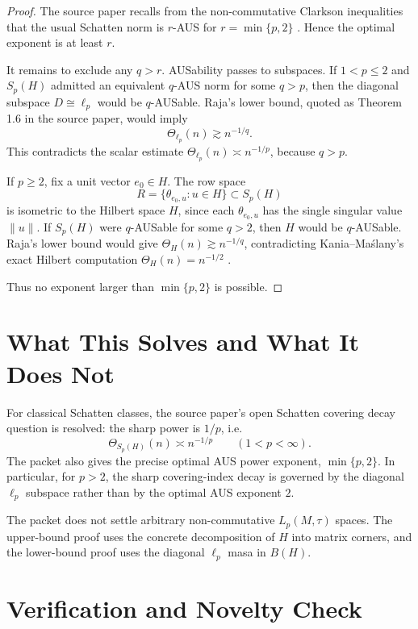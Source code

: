 \documentclass[11pt]{article}
\begin{document}
\begin{proof}
The source paper recalls from the non-commutative Clarkson inequalities that
the usual Schatten norm is \(r\)-AUS for \(r=\min\{p,2\}\)
\cite[Appendix]{KM2512}.  Hence the optimal exponent is at least \(r\).

It remains to exclude any \(q>r\).  AUSability passes to subspaces.  If
\(1<p\le2\) and \(S_p(H)\) admitted an equivalent \(q\)-AUS norm for some
\(q>p\), then the diagonal subspace \(D\cong\ell_p\) would be \(q\)-AUSable.
Raja's lower bound, quoted as Theorem 1.6 in the source paper, would imply
\[
  \Theta_{\ell_p}(n)\gtrsim n^{-1/q}.
\]
This contradicts the scalar estimate \(\Theta_{\ell_p}(n)\asymp n^{-1/p}\),
because \(q>p\).

If \(p\ge2\), fix a unit vector \(e_0\in H\).  The row space
\[
  R=\{\theta_{e_0,u}:u\in H\}\subset S_p(H)
\]
is isometric to the Hilbert space \(H\), since each \(\theta_{e_0,u}\) has the
single singular value \(\|u\|\).  If \(S_p(H)\) were \(q\)-AUSable for some
\(q>2\), then \(H\) would be \(q\)-AUSable.  Raja's lower bound would give
\(\Theta_H(n)\gtrsim n^{-1/q}\), contradicting Kania--Ma\'slany's exact
Hilbert computation \(\Theta_H(n)=n^{-1/2}\) \cite[Theorem 2.2]{KM2512}.

Thus no exponent larger than \(\min\{p,2\}\) is possible.
\end{proof}

\section*{What This Solves and What It Does Not}

For classical Schatten classes, the source paper's open Schatten covering
decay question is resolved: the sharp power is \(1/p\), i.e.
\[
  \Theta_{S_p(H)}(n)\asymp n^{-1/p}\qquad(1<p<\infty).
\]
The packet also gives the precise optimal AUS power exponent,
\(\min\{p,2\}\).  In particular, for \(p>2\), the sharp covering-index decay
is governed by the diagonal \(\ell_p\) subspace rather than by the optimal AUS
exponent \(2\).

The packet does not settle arbitrary non-commutative \(L_p(M,\tau)\) spaces.
The upper-bound proof uses the concrete decomposition of \(H\) into matrix
corners, and the lower-bound proof uses the diagonal \(\ell_p\) masa in
\(B(H)\).

\section*{Verification and Novelty Check}
\end{document}
